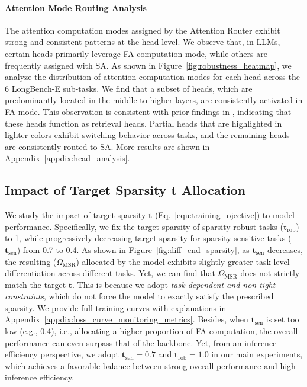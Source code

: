 \paragraph{Attention Mode Routing Analysis}
The attention computation modes assigned by the Attention Router exhibit strong and consistent patterns at the head level. 
We observe that, in LLMs, certain heads primarily leverage FA computation mode, while others are frequently assigned with SA.
As shown in Figure~\ref{fig:robustness_heatmap}, we analyze the distribution of attention computation modes for each head across the 6 LongBench-E sub-tasks. 
We find that a subset of heads, which are predominantly located in the middle to higher layers, are consistently activated in FA mode.
This observation is consistent with prior findings in \citet{wu2024retrieval}, indicating that these heads function as retrieval heads.
Partial heads that are highlighted in lighter colors exhibit switching behavior across tasks, and the remaining heads are consistently routed to SA.
More results are shown in Appendix~\ref{appdix:head_analysis}.


\subsection{Impact of Target Sparsity $\boldsymbol{t}$ Allocation}
\label{abla:sparsity_ratio_allocation}
We study the impact of target sparsity $\boldsymbol{t}$ (Eq.~\ref{equ:training_ojective}) to model performance. 
Specifically, we fix the target sparsity of sparsity-robust tasks ($\boldsymbol{t}_\mathrm{rob}$) to 1, while progressively decreasing target sparsity for sparsity-sensitive tasks ($\boldsymbol{t}_\mathrm{sen}$) from 0.7 to 0.4.
As shown in Figure~\ref{fig:diff_end_sparsity}, as $\boldsymbol{t}_\mathrm{sen}$ decreases, the resulting ($\Omega_{\mathrm{MSR}}$) allocated by the model exhibits slightly greater task-level differentiation across different tasks. 
Yet, we can find that $\Omega_{\mathrm{MSR}}$ does not strictly match the target $\boldsymbol{t}$.
This is because we adopt \emph{task-dependent and non-tight constraints}, which do not force the model to exactly satisfy the prescribed sparsity. 
We provide full training curves with explanations in Appendix~\ref{appdix:loss_curve_monitoring_metrics}.
Besides, when $\boldsymbol{t}_\mathrm{sen}$ is set too low (e.g., 0.4), i.e., allocating a higher proportion of FA computation, the overall performance can even surpass that of the backbone. 
Yet, from an inference-efficiency perspective, we adopt $\boldsymbol{t}_\mathrm{sen}=0.7$ and $\boldsymbol{t}_\mathrm{rob}=1.0$ in our main experiments, which achieves a favorable balance between strong overall performance and high inference efficiency.

